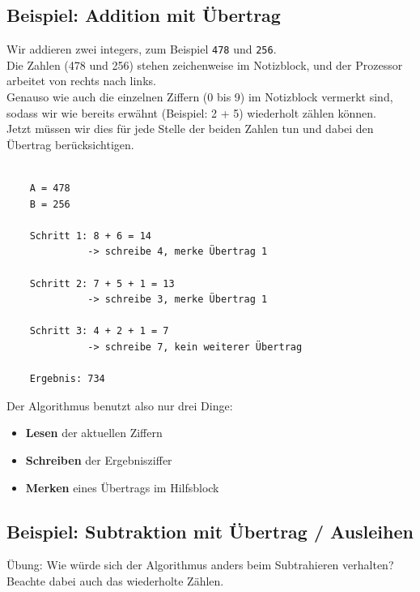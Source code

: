 \documentclass{article}
\begin{document}
          \subsection{Beispiel: Addition mit Übertrag}

        
  Wir addieren zwei integers, zum Beispiel \texttt{478} und \texttt{256}.\\
            Die Zahlen (478 und 256) stehen zeichenweise im Notizblock, und der Prozessor arbeitet von rechts nach links. \\
            Genauso wie auch die einzelnen Ziffern (0 bis 9) im Notizblock vermerkt sind, sodass wir wie bereits erwähnt (Beispiel: 2 + 5) wiederholt zählen können. \\
            Jetzt müssen wir dies für jede Stelle der beiden Zahlen tun und dabei den Übertrag berücksichtigen.\\

        
  \begin{verbatim}

    A = 478
    B = 256

    Schritt 1: 8 + 6 = 14
              -> schreibe 4, merke Übertrag 1

    Schritt 2: 7 + 5 + 1 = 13
              -> schreibe 3, merke Übertrag 1

    Schritt 3: 4 + 2 + 1 = 7
              -> schreibe 7, kein weiterer Übertrag

    Ergebnis: 734
          \end{verbatim}

        
  Der Algorithmus benutzt also nur drei Dinge:

          \begin{itemize}
            \item \textbf{Lesen} der aktuellen Ziffern
            \item \textbf{Schreiben} der Ergebnisziffer
            \item \textbf{Merken} eines Übertrags im Hilfsblock

          \end{itemize}


          \subsection{Beispiel: Subtraktion mit Übertrag / Ausleihen}

        Übung: Wie würde sich der Algorithmus anders beim Subtrahieren verhalten? Beachte dabei auch das wiederholte Zählen.
        
\end{document}
